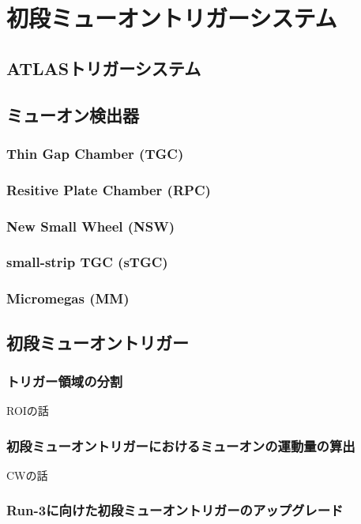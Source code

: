 \chapter{初段ミューオントリガーシステム}
\section{ATLASトリガーシステム}

\section{ミューオン検出器}
\subsection{Thin Gap Chamber (TGC)}

\subsection{Resitive Plate Chamber (RPC)}

\subsection{New Small Wheel (NSW)}

\subsection{small-strip TGC (sTGC)}

\subsection{Micromegas (MM)}

\section{初段ミューオントリガー}

\subsection{トリガー領域の分割}
ROIの話
\subsection{初段ミューオントリガーにおけるミューオンの運動量の算出}
CWの話

\subsection{Run-3に向けた初段ミューオントリガーのアップグレード}

